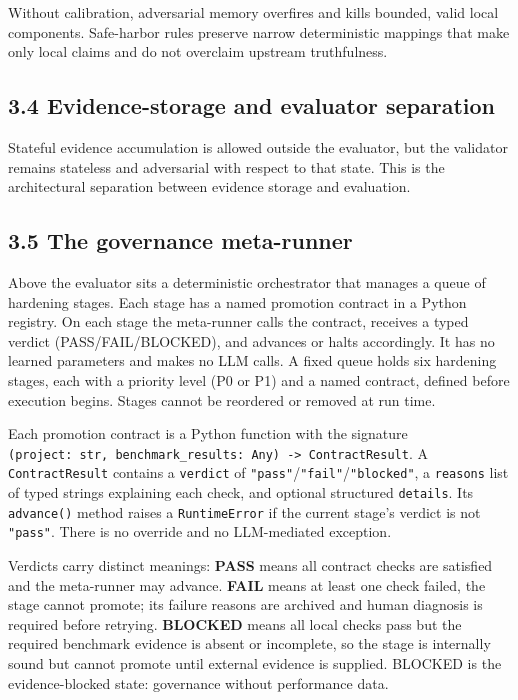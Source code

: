\documentclass[
  11pt]{article}
\begin{document}
Without calibration, adversarial memory overfires and kills bounded,
valid local components. Safe-harbor rules preserve narrow deterministic
mappings that make only local claims and do not overclaim upstream
truthfulness.

\subsection{3.4 Evidence-storage and evaluator
separation}\label{evidence-storage-and-evaluator-separation}

Stateful evidence accumulation is allowed outside the evaluator, but the
validator remains stateless and adversarial with respect to that state.
This is the architectural separation between evidence storage and
evaluation.

\subsection{3.5 The governance
meta-runner}\label{the-governance-meta-runner}

Above the evaluator sits a deterministic orchestrator that manages a
queue of hardening stages. Each stage has a named promotion contract in
a Python registry. On each stage the meta-runner calls the contract,
receives a typed verdict (PASS/FAIL/BLOCKED), and advances or halts
accordingly. It has no learned parameters and makes no LLM calls. A
fixed queue holds six hardening stages, each with a priority level (P0
or P1) and a named contract, defined before execution begins. Stages
cannot be reordered or removed at run time.

Each promotion contract is a Python function with the signature
\texttt{(project:\ str,\ benchmark\_results:\ Any)\ -\textgreater{}\ ContractResult}.
A \texttt{ContractResult} contains a \texttt{verdict} of
\texttt{"pass"}/\texttt{"fail"}/\texttt{"blocked"}, a \texttt{reasons}
list of typed strings explaining each check, and optional structured
\texttt{details}. Its \texttt{advance()} method raises a
\texttt{RuntimeError} if the current stage's verdict is not
\texttt{"pass"}. There is no override and no LLM-mediated exception.

Verdicts carry distinct meanings: \textbf{PASS} means all contract
checks are satisfied and the meta-runner may advance. \textbf{FAIL}
means at least one check failed, the stage cannot promote; its failure
reasons are archived and human diagnosis is required before retrying.
\textbf{BLOCKED} means all local checks pass but the required benchmark
evidence is absent or incomplete, so the stage is internally sound but
cannot promote until external evidence is supplied. BLOCKED is the
evidence-blocked state: governance without performance data.
\end{document}
